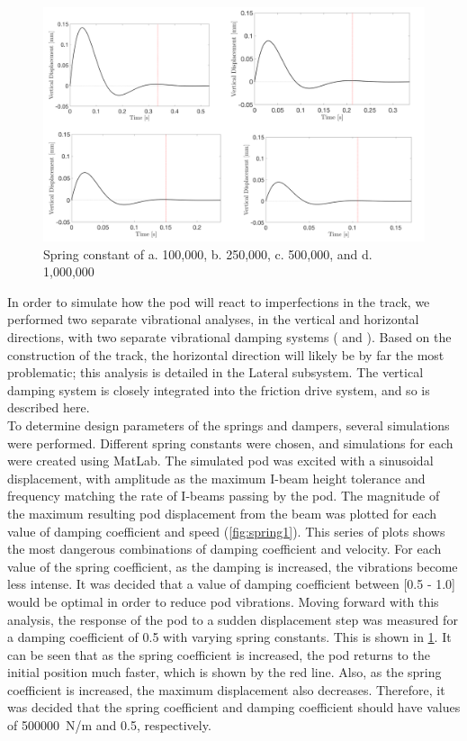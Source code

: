 \documentclass[main.tex]{subfiles}
\begin{document}
    \begin{figure}
        \centering
        \includegraphics[width=\textwidth]{images/fig2}
        \caption{Spring constant of a. 100,000, b. 250,000, c. 500,000, and d. 1,000,000}
        \label{fig:spring2}
    \end{figure}
    In order to simulate how the pod will react to imperfections in the track, we performed two separate vibrational analyses, in the vertical and horizontal directions, with two separate vibrational damping systems ( and ). Based on the construction of the track, the horizontal direction will likely be by far the most problematic; this analysis is detailed in the Lateral subsystem. The vertical damping system is closely integrated into the friction drive system, and so is described here.\\

    To determine design parameters of the springs and dampers, several simulations were performed. Different spring constants were chosen, and simulations for each were created using MatLab. The simulated pod was excited with a sinusoidal displacement, with amplitude as the maximum I-beam height tolerance and frequency matching the rate of I-beams passing by the pod. The magnitude of the maximum resulting pod displacement from the beam was plotted for each value of damping coefficient and speed (\ref{fig:spring1}). This series of plots shows the most dangerous combinations of damping coefficient and velocity. For each value of the spring coefficient, as the damping is increased, the vibrations become less intense. It was decided that a value of damping coefficient between [0.5 - 1.0] would be optimal in order to reduce pod vibrations.  Moving forward with this analysis, the response of the pod to a sudden displacement step was measured for a damping coefficient of 0.5 with varying spring constants. This is shown in \ref{fig:spring2}. It can be seen that as the spring coefficient is increased, the pod returns to the initial position much faster, which is shown by the red line. Also, as the spring coefficient is increased, the maximum displacement also decreases. Therefore, it was decided that the spring coefficient and damping coefficient should have values of \SI{500000}{N/m} and 0.5, respectively. \\
\end{document}
